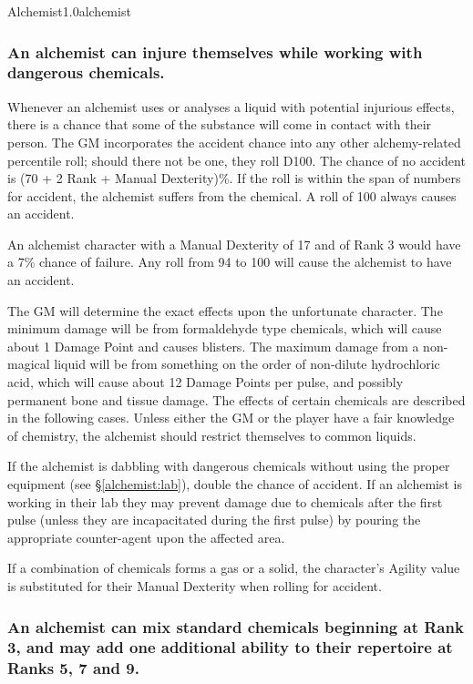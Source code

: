 \begin{skill}{Alchemist}{1.0}{alchemist}
\subsubsection{An alchemist can injure themselves while working with
dangerous chemicals.}

Whenever an alchemist uses or analyses a liquid with potential
injurious effects, there is a chance that some of the substance will
come in contact with their person.  The GM incorporates the accident
chance into any other alchemy-related percentile roll; should there
not be one, they roll D100.  The chance of no accident is (70 + 2 \x
Rank + Manual Dexterity)\%.  If the roll is within the span of numbers
for accident, the alchemist suffers from the chemical.  A roll of 100
always causes an accident.

\begin{example}
An alchemist character with a Manual Dexterity of 17 and of Rank 3
would have a 7\% chance of failure.  Any roll from 94 to 100 will cause
the alchemist to have an accident.
\end{example}

The GM will determine the exact effects upon the unfortunate
character.  The minimum damage will be from formaldehyde type
chemicals, which will cause about 1 Damage Point and causes blisters.
The maximum damage from a non-magical liquid will be from something on
the order of non-dilute hydrochloric acid, which will cause about 12
Damage Points per pulse, and possibly permanent bone and tissue
damage.  The effects of certain chemicals are described in the
following cases.  Unless either the GM or the player have a fair
knowledge of chemistry, the alchemist should restrict themselves to
common liquids.

If the alchemist is dabbling with dangerous chemicals without using
the proper equipment (see \S\ref{alchemist:lab}), double the chance of
accident.  If an alchemist is working in their lab they may prevent
damage due to chemicals after the first pulse (unless they are
incapacitated during the first pulse) by pouring the appropriate
counter-agent upon the affected area.

If a combination of chemicals forms a gas or a solid, the character's
Agility value is substituted for their Manual Dexterity when rolling
for accident.

\subsubsection{An alchemist can mix standard chemicals beginning at
Rank 3, and may add one additional ability to their repertoire at
Ranks 5, 7 and 9.}


\end{skill}
